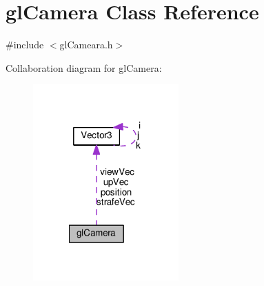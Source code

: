 \hypertarget{classgl_camera}{\section{gl\+Camera Class Reference}
\label{classgl_camera}
}


{\ttfamily \#include $<$gl\+Cameara.\+h$>$}



Collaboration diagram for gl\+Camera\+:\nopagebreak
\begin{figure}[H]
\begin{center}
\leavevmode
\includegraphics[width=158pt]{classgl_camera__coll__graph}
\end{center}
\end{figure}
